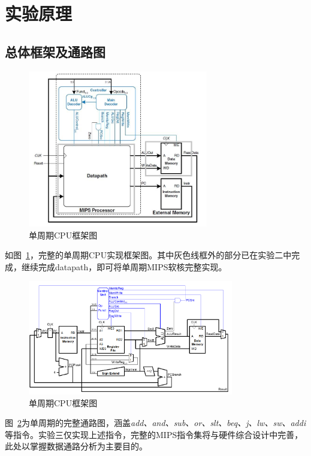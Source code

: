 \section{实验原理}
\subsection{总体框架及通路图}
\begin{figure}[htbp]
    \centering
    \includegraphics[width = 0.7\textwidth]{image/mips_framework.png}
    \caption{单周期CPU框架图}
    \label{fig:mips_framework}
\end{figure}
如图~\ref{fig:mips_framework}，完整的单周期CPU实现框架图。其中灰色线框外的部分已在实验二中完成，继续完成datapath，即可将单周期MIPS软核完整实现。

\begin{figure}[htbp]
    \centering
    \includegraphics[width = 0.8\textwidth]{image/mips_single_cycle_datapath.png}
    \caption{单周期CPU框架图}
    \label{fig:mips_single_cycle_datapath}
\end{figure}

图~\ref{fig:mips_single_cycle_datapath}为单周期的完整通路图，涵盖\textit{add、and、sub、or、slt、beq、j、lw、sw、addi}等指令。实验三仅实现上述指令，完整的MIPS指令集将与硬件综合设计中完善，此处以掌握数据通路分析为主要目的。

